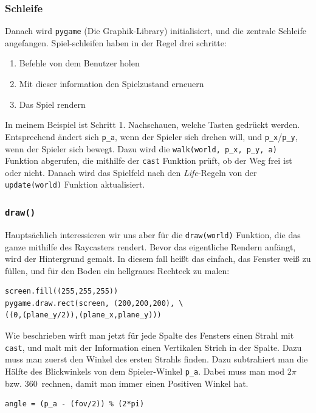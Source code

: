 \documentclass[a4paper,12pt]{report}
\begin{document}
\subsubsection{Schleife}
Danach wird \texttt{pygame} (Die Graphik-Library) initialisiert, und die zentrale Schleife angefangen. Spiel-schleifen haben in der Regel drei schritte:
\begin{enumerate}
	\item Befehle von dem Benutzer holen
	\item Mit dieser information den Spielzustand erneuern
	\item Das Spiel rendern
\end{enumerate}
In meinem Beispiel ist Schritt 1. Nachschauen, welche Tasten gedr\"uckt werden. Entsprechend ändert sich \texttt{p\_a}, wenn der Spieler sich drehen will, und \texttt{p\_x}/\texttt{p\_y}, wenn der Spieler sich bewegt. Dazu wird die \texttt{walk(world, p\_x, p\_y, a)} Funktion abgerufen, die mithilfe der \texttt{cast} Funktion prüft, ob der Weg frei ist oder nicht. Danach wird das Spielfeld nach den \textit{Life}-Regeln von der \texttt{update(world)} Funktion aktualisiert.

\subsubsection{\texttt{draw()}}
Hauptsächlich interessieren wir uns aber für die \texttt{draw(world)} Funktion, die das ganze mithilfe des Raycasters rendert. Bevor das eigentliche Rendern anfängt, wird der Hintergrund gemalt. In diesem fall heißt das einfach, das Fenster weiß zu füllen, und für den Boden ein hellgraues Rechteck zu malen:
\begin{Verbatim}[baselinestretch=1.0, xleftmargin=1cm]
screen.fill((255,255,255))
pygame.draw.rect(screen, (200,200,200), \
((0,(plane_y/2)),(plane_x,plane_y)))
\end{Verbatim}

Wie beschrieben wirft man jetzt für jede Spalte des Fensters einen Strahl mit \texttt{cast}, und malt mit der Information einen Vertikalen Strich in der Spalte. Dazu muss man zuerst den Winkel des ersten Strahls finden. Dazu subtrahiert man die Hälfte des Blickwinkels von dem Spieler-Winkel \texttt{p\_a}. Dabei muss man mod $2\pi$ bzw. 360\textdegree\ rechnen, damit man immer einen Positiven Winkel hat.
\begin{Verbatim}[baselinestretch=1.0, xleftmargin=1cm]
angle = (p_a - (fov/2)) % (2*pi)
\end{Verbatim}
\end{document}
